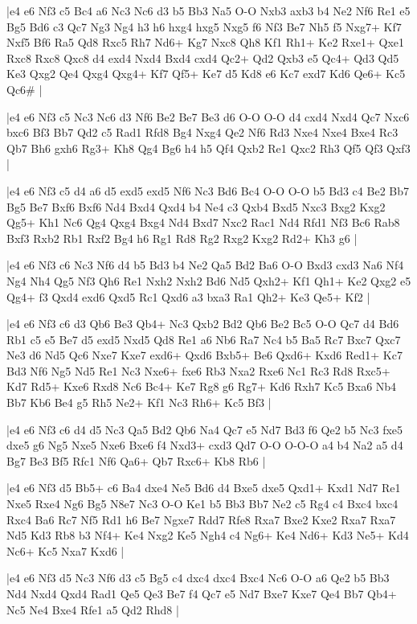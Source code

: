 \whitename{}
\blackname{}
\makegametitle
|e4 e6 Nf3 c5 Bc4 a6 Nc3 Nc6 d3 b5 Bb3 Na5 O-O Nxb3 axb3 b4 Ne2 Nf6 Re1 e5 Bg5 Bd6 c3 Qc7 Ng3 Ng4 h3 h6 hxg4 hxg5 Nxg5 f6 Nf3 Be7 Nh5 f5 Nxg7+ Kf7 Nxf5 Bf6 Ra5 Qd8 Rxc5 Rh7 Nd6+ Kg7 Nxc8 Qh8 Kf1 Rh1+ Ke2 Rxe1+ Qxe1 Rxc8 Rxc8 Qxc8 d4 exd4 Nxd4 Bxd4 cxd4 Qc2+ Qd2 Qxb3 e5 Qc4+ Qd3 Qd5 Ke3 Qxg2 Qe4 Qxg4 Qxg4+ Kf7 Qf5+ Ke7 d5 Kd8 e6 Kc7 exd7 Kd6 Qe6+ Kc5 Qc6\#  |

\whitename{}
\blackname{}
\makegametitle
|e4 e6 Nf3 c5 Nc3 Nc6 d3 Nf6 Be2 Be7 Be3 d6 O-O O-O d4 cxd4 Nxd4 Qc7 Nxc6 bxc6 Bf3 Bb7 Qd2 c5 Rad1 Rfd8 Bg4 Nxg4 Qe2 Nf6 Rd3 Nxe4 Nxe4 Bxe4 Rc3 Qb7 Bh6 gxh6 Rg3+ Kh8 Qg4 Bg6 h4 h5 Qf4 Qxb2 Re1 Qxc2 Rh3 Qf5 Qf3 Qxf3  |

\whitename{}
\blackname{}
\makegametitle
|e4 e6 Nf3 c5 d4 a6 d5 exd5 exd5 Nf6 Nc3 Bd6 Bc4 O-O O-O b5 Bd3 c4 Be2 Bb7 Bg5 Be7 Bxf6 Bxf6 Nd4 Bxd4 Qxd4 b4 Ne4 c3 Qxb4 Bxd5 Nxc3 Bxg2 Kxg2 Qg5+ Kh1 Nc6 Qg4 Qxg4 Bxg4 Nd4 Bxd7 Nxc2 Rac1 Nd4 Rfd1 Nf3 Bc6 Rab8 Bxf3 Rxb2 Rb1 Rxf2 Bg4 h6 Rg1 Rd8 Rg2 Rxg2 Kxg2 Rd2+ Kh3 g6  |

\whitename{}
\blackname{}
\makegametitle
|e4 e6 Nf3 c6 Nc3 Nf6 d4 b5 Bd3 b4 Ne2 Qa5 Bd2 Ba6 O-O Bxd3 cxd3 Na6 Nf4 Ng4 Nh4 Qg5 Nf3 Qh6 Re1 Nxh2 Nxh2 Bd6 Nd5 Qxh2+ Kf1 Qh1+ Ke2 Qxg2 e5 Qg4+ f3 Qxd4 exd6 Qxd5 Rc1 Qxd6 a3 bxa3 Ra1 Qh2+ Ke3 Qe5+ Kf2  |

\whitename{}
\blackname{}
\makegametitle
|e4 e6 Nf3 c6 d3 Qb6 Be3 Qb4+ Nc3 Qxb2 Bd2 Qb6 Be2 Bc5 O-O Qc7 d4 Bd6 Rb1 c5 e5 Be7 d5 exd5 Nxd5 Qd8 Re1 a6 Nb6 Ra7 Nc4 b5 Ba5 Rc7 Bxc7 Qxc7 Ne3 d6 Nd5 Qc6 Nxe7 Kxe7 exd6+ Qxd6 Bxb5+ Be6 Qxd6+ Kxd6 Red1+ Kc7 Bd3 Nf6 Ng5 Nd5 Re1 Nc3 Nxe6+ fxe6 Rb3 Nxa2 Rxe6 Nc1 Rc3 Rd8 Rxc5+ Kd7 Rd5+ Kxe6 Rxd8 Nc6 Bc4+ Ke7 Rg8 g6 Rg7+ Kd6 Rxh7 Kc5 Bxa6 Nb4 Bb7 Kb6 Be4 g5 Rh5 Ne2+ Kf1 Nc3 Rh6+ Kc5 Bf3  |

\whitename{}
\blackname{}
\makegametitle
|e4 e6 Nf3 c6 d4 d5 Nc3 Qa5 Bd2 Qb6 Na4 Qc7 e5 Nd7 Bd3 f6 Qe2 b5 Nc3 fxe5 dxe5 g6 Ng5 Nxe5 Nxe6 Bxe6 f4 Nxd3+ cxd3 Qd7 O-O O-O-O a4 b4 Na2 a5 d4 Bg7 Be3 Bf5 Rfc1 Nf6 Qa6+ Qb7 Rxc6+ Kb8 Rb6  |

\whitename{}
\blackname{}
\makegametitle
|e4 e6 Nf3 d5 Bb5+ c6 Ba4 dxe4 Ne5 Bd6 d4 Bxe5 dxe5 Qxd1+ Kxd1 Nd7 Re1 Nxe5 Rxe4 Ng6 Bg5 N8e7 Nc3 O-O Ke1 b5 Bb3 Bb7 Ne2 c5 Rg4 c4 Bxc4 bxc4 Rxc4 Ba6 Rc7 Nf5 Rd1 h6 Be7 Ngxe7 Rdd7 Rfe8 Rxa7 Bxe2 Kxe2 Rxa7 Rxa7 Nd5 Kd3 Rb8 b3 Nf4+ Ke4 Nxg2 Ke5 Ngh4 c4 Ng6+ Ke4 Nd6+ Kd3 Ne5+ Kd4 Nc6+ Kc5 Nxa7 Kxd6  |

\whitename{}
\blackname{}
\makegametitle
|e4 e6 Nf3 d5 Nc3 Nf6 d3 c5 Bg5 c4 dxc4 dxc4 Bxc4 Nc6 O-O a6 Qe2 b5 Bb3 Nd4 Nxd4 Qxd4 Rad1 Qe5 Qe3 Be7 f4 Qc7 e5 Nd7 Bxe7 Kxe7 Qe4 Bb7 Qb4+ Nc5 Ne4 Bxe4 Rfe1 a5 Qd2 Rhd8  |

